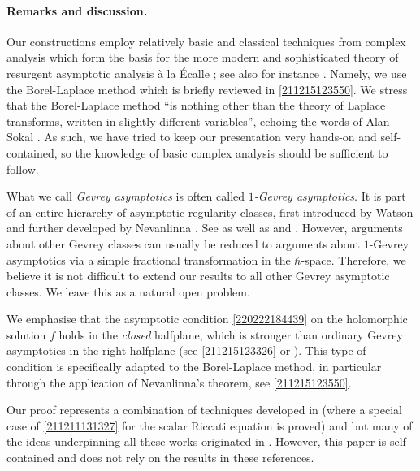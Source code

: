 \documentclass[11pt]{article}
\begin{document}
\paragraph{Remarks and discussion.}
Our constructions employ relatively basic and classical techniques from complex analysis which form the basis for the more modern and sophisticated theory of resurgent asymptotic analysis à la Écalle \cite{zbMATH03971144}; see also for instance \cite{MR2474083,sauzin2014introduction,MR3495546}.
Namely, we use the Borel-Laplace method which is briefly reviewed in \autoref{211215123550}.
We stress that the Borel-Laplace method ``is nothing other than the theory of Laplace transforms, written in slightly different variables'', echoing the words of Alan Sokal \cite{MR558468}.
As such, we have tried to keep our presentation very hands-on and self-contained, so the knowledge of basic complex analysis should be sufficient to follow.

What we call \textit{Gevrey asymptotics} is often called \textit{$1$-Gevrey asymptotics}.
It is part of an entire hierarchy of asymptotic regularity classes, first introduced by Watson \cite{zbMATH02629428} and further developed by Nevanlinna \cite{nevanlinna1918theorie}.
See \cite{MR542737,MR579749} as well as \cite[§1.2]{MR3495546} and \cite[§XI-2]{MR1697415}.
However, arguments about other Gevrey classes can usually be reduced to arguments about $1$-Gevrey asymptotics via a simple fractional transformation in the $\hbar$-space.
Therefore, we believe it is not difficult to extend our results to all other Gevrey asymptotic classes.
We leave this as a natural open problem.

We emphasise that the asymptotic condition \eqref{220222184439} on the holomorphic solution $f$ holds in the \textit{closed} halfplane, which is stronger than ordinary Gevrey asymptotics in the right halfplane (see \autoref{211215123326} or \cite[§A.5 and §A.16]{MY2008.06492}).
This type of condition is specifically adapted to the Borel-Laplace method, in particular through the application of Nevanlinna's theorem, see \autoref{211215123550}.

Our proof represents a combination of techniques developed in \cite{MY2008.06492} (where a special case of \autoref{211211131327} for the scalar Riccati equation is proved) and \cite{MY211216122156} but many of the ideas underpinning all these works originated in \cite{nikolaev2019triangularisation}.
However, this paper is self-contained and does not rely on the results in these references.
\end{document}
